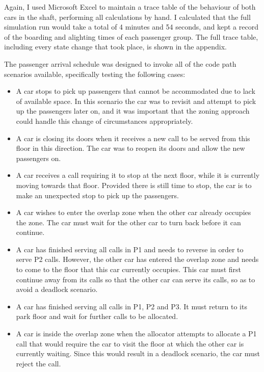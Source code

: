 \documentclass{UoYCSproject}
\begin{document}
Again, I used Microsoft Excel to maintain a trace table of the behaviour of both cars in the shaft, performing all calculations by hand.  I calculated that the full simulation run would take a total of 4 minutes and 54 seconds, and kept a record of the boarding and alighting times of each passenger group.  The full trace table, including every state change that took place, is shown in the appendix.

The passenger arrival schedule was designed to invoke all of the code path scenarios available, specifically testing the following cases:
	\begin{itemize}
		\item A car stops to pick up passengers that cannot be accommodated due to lack of available space.  In this scenario the car was to revisit and attempt to pick up the passengers later on, and it was important that the zoning approach could handle this change of circumstances appropriately.
		\item A car is closing its doors when it receives a new call to be served from this floor in this direction.  The car was to reopen its doors and allow the new passengers on.
		\item A car receives a call requiring it to stop at the next floor, while it is currently moving towards that floor.  Provided there is still time to stop, the car is to make an unexpected stop to pick up the passengers.
		\item A car wishes to enter the overlap zone when the other car already occupies the zone.  The car must wait for the other car to turn back before it can continue.
		\item A car has finished serving all calls in P1 and needs to reverse in order to serve P2 calls.  However, the other car has entered the overlap zone and needs to come to the floor that this car currently occupies.  This car must first continue away from its calls so that the other car can serve its calls, so as to avoid a deadlock scenario.
		\item A car has finished serving all calls in P1, P2 and P3.  It must return to its park floor and wait for further calls to be allocated.
		\item A car is inside the overlap zone when the allocator attempts to allocate a P1 call that would require the car to visit the floor at which the other car is currently waiting.  Since this would result in a deadlock scenario, the car must reject the call.
	\end{itemize}
\end{document}
